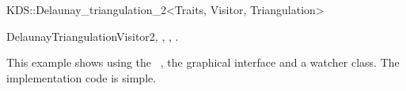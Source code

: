 \begin{ccRefClass}{KDS::Delaunay_triangulation_2<Traits, Visitor, Triangulation>}
\ccOperations


\ccSeeAlso

DelaunayTriangulationVisitor2,
,
,
.

\ccExample

This example shows using the \ccRefName\ , the graphical interface and
a watcher class. The implementation code is simple.




\end{ccRefClass}


